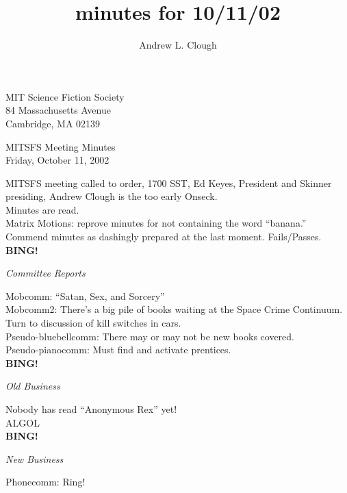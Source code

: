\documentclass{article}
\title{minutes for 10/11/02}
\author{Andrew L. Clough}
\begin{document}
\begin{center}
MIT Science Fiction Society\\
84 Massachusetts Avenue\\
Cambridge, MA 02139\\
\end{center}
\begin{center}
MITSFS Meeting Minutes\\
Friday, October 11, 2002\\
\end{center}

MITSFS meeting called to order, 1700 SST, Ed Keyes, President and Skinner presiding, Andrew Clough is the too early Onseck.\\

Minutes are read.\\

Matrix Motions:  reprove minutes for not containing the word ``banana.'' Commend minutes as dashingly prepared at the last moment.  Fails/Passes.\\

\textbf{BING!}
\begin{center}
\textit{Committee Reports}
\end{center}

Mobcomm:  ``Satan, Sex, and Sorcery''\\

Mobcomm2:  There's a big pile of books waiting at the Space Crime Continuum.\\

Turn to discussion of kill switches in cars.\\

Pseudo-bluebellcomm:  There may or may not be new books covered.\\

Pseudo-pianocomm:  Must find and activate prentices.\\

\textbf{BING!}
\begin{center}
\textit{Old Business}
\end{center}

Nobody has read ``Anonymous Rex'' yet!\\

ALGOL\\

\textbf{BING!}
\begin{center}
\textit{New Business}
\end{center}

Phonecomm: Ring!\\
\end{document}
